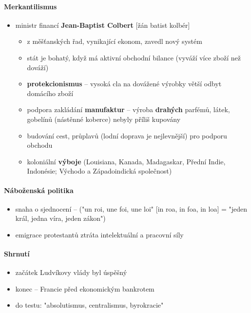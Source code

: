 \paragraph{Merkantilismus}
\begin{itemize}
\item ministr financí \textbf{Jean-Baptist Colbert} [žán batist kolbér]
	\begin{itemize}
	\item z měšťanských řad, vynikající ekonom, zavedl nový systém
	\item stát je bohatý, když má aktivní obchodní bilance (vyváží více zboží než dováží)
	\item[\ra] \textbf{protekcionismus} -- vysoká cla na dovážené výrobky \ra větší odbyt domácího zboží
	\item podpora zakládání \textbf{manufaktur} -- výroba \textbf{drahých} parfémů, látek, gobelínů (nástěnné koberce) \ra nebyly příliš kupovány
	\item budování cest, průplavů (lodní doprava je nejlevnější) pro podporu obchodu
	\item koloniální \textbf{výboje} (Louisiana, Kanada, Madagaskar, Přední Indie, Indonésie; Východo a Západoindická společnost)
	\end{itemize}
\end{itemize}

\paragraph{Náboženská politika}
\begin{itemize}
\item snaha o sjednocení -- ("un roi, une foi, une loi" [in roa, in foa, in loa] = "jeden král, jedna víra, jeden zákon")
\item {} \ra emigrace protestantů \ra ztráta intelektuální a pracovní síly
\end{itemize}

\paragraph{Shrnutí}
\begin{itemize}
\item začátek Ludvíkovy vlády byl úspěšný
\item konec -- Francie před ekonomickým bankrotem
\item do testu: "absolutismus, centralismus, byrokracie"
\end{itemize}

